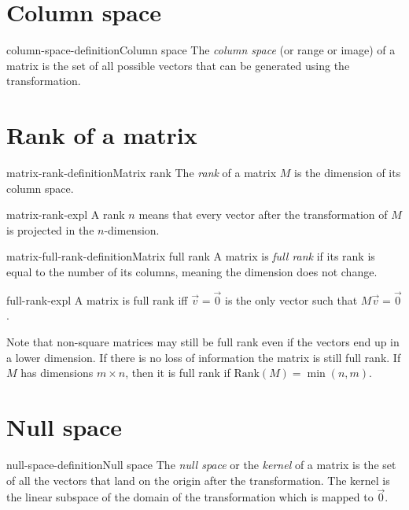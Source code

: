 \documentclass[preview]{standalone}
\begin{document}
\section{Column space}

\begin{snippetdefinition}{column-space-definition}{Column space}
    The \textit{column space} (or range or image) of a matrix is the
    set of all possible vectors that can be generated using the transformation.
\end{snippetdefinition}

\section{Rank of a matrix}

\begin{snippetdefinition}{matrix-rank-definition}{Matrix rank}
    The \textit{rank} of a matrix \(M\) is the dimension of its column space.
\end{snippetdefinition}

\begin{snippet}{matrix-rank-expl}
    A rank \(n\) means that every vector after the transformation of \(M\)
    is projected in the \(n\)-dimension.
\end{snippet}

\begin{snippetdefinition}{matrix-full-rank-definition}{Matrix full rank}
    A matrix is \textit{full rank} if its rank is equal to the number of its columns, meaning
    the dimension does not change.
\end{snippetdefinition}

\begin{snippet}{full-rank-expl}
    A matrix is full rank iff \(\vec{v}=\vec{0}\) is the only vector such that \(M\vec{v}=\vec{0}\).
    
    Note that non-square matrices may still be full rank even if the vectors end up in a lower dimension.
    If there is no loss of information the matrix is still full rank.
    If \(M\) has dimensions \(m \times n\), then it is full rank if \(\text{Rank}(M)=\min(n,m)\).
\end{snippet}

\section{Null space}

\begin{snippetdefinition}{null-space-definition}{Null space}
    The \textit{null space} or the \textit{kernel} of a matrix is the set of all the vectors that land on the origin
    after the transformation.
    The kernel is the linear subspace of the domain of the transformation which is mapped to \(\vec{0}\).
\end{snippetdefinition}
\end{document}
